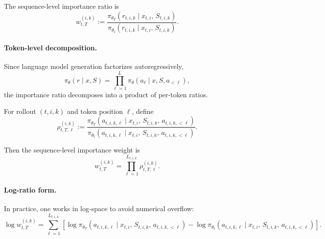 The sequence-level importance ratio is
\begin{equation}
\label{eq:iw_seq_ratio}
    w_{t,T}^{(i,k)} := \frac{\pi_{\theta_T}(r_{t,i,k} \mid x_{t,i},\, S_{t,i,k})}{\pi_{\theta_t}(r_{t,i,k} \mid x_{t,i},\, S_{t,i,k})}.
\end{equation}

\paragraph{Token-level decomposition.}
\label{app:iw:token}

Since language model generation factorizes autoregressively,
\begin{equation}
    \pi_\theta(r \mid x, S) = \prod_{\ell=1}^{L} \pi_\theta(a_\ell \mid x, S, a_{<\ell}),
\end{equation}
the importance ratio decomposes into a product of per-token ratios.

\begin{definition}
\label{def:token_ratio}
For rollout $(t,i,k)$ and token position $\ell$, define
\begin{equation}
\label{eq:token_ratio}
    \rho_{t,T,\ell}^{(i,k)} := \frac{\pi_{\theta_T}(a_{t,i,k,\ell} \mid x_{t,i},\, S_{t,i,k},\, a_{t,i,k,<\ell})}{\pi_{\theta_t}(a_{t,i,k,\ell} \mid x_{t,i},\, S_{t,i,k},\, a_{t,i,k,<\ell})}.
\end{equation}
\end{definition}

Then the sequence-level importance weight is
\begin{equation}
\label{eq:seq_weight}
    w_{t,T}^{(i,k)} = \prod_{\ell=1}^{L_{t,i,k}} \rho_{t,T,\ell}^{(i,k)}.
\end{equation}

\paragraph{Log-ratio form.}
In practice, one works in log-space to avoid numerical overflow:
\begin{equation}
\label{eq:log_ratio}
    \log w_{t,T}^{(i,k)} = \sum_{\ell=1}^{L_{t,i,k}} \left[\log \pi_{\theta_T}(a_{t,i,k,\ell} \mid x_{t,i},\, S_{t,i,k},\, a_{t,i,k,<\ell}) - \log \pi_{\theta_t}(a_{t,i,k,\ell} \mid x_{t,i},\, S_{t,i,k},\, a_{t,i,k,<\ell})\right].
\end{equation}

